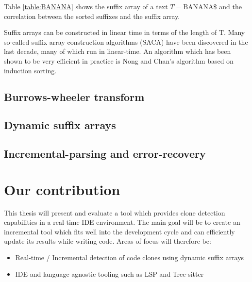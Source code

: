 Table \ref{table:BANANA} shows the suffix array of a text $T=\text{BANANA\$}$ and the correlation
between the sorted suffixes and the suffix array.



Suffix arrays can be constructed in linear time in terms of the length of T. Many
so-called suffix array construction algorithms (SACA) have been discovered in the last
decade\cite{SuffixArrayConstruction}, many of which run in linear-time. An algorithm
which has been shown to be very efficient in practice is Nong and
Chan's\cite{LinearTimeSuffixArraySAIS} algorithm based on induction sorting.



\subsection{Burrows-wheeler transform}


\subsection{Dynamic suffix arrays}


\subsection{Incremental-parsing and error-recovery}



\section{Our contribution}

This thesis will present and evaluate a tool which provides clone detection capabilities
in a real-time IDE environment. The main goal will be to create an incremental tool which
fits well into the development cycle and can efficiently update its results while writing
code. Areas of focus will therefore be:

\begin{itemize}
	\item Real-time / Incremental detection of code clones using dynamic suffix arrays
	\item IDE and language agnostic tooling such as LSP and Tree-sitter
\end{itemize}

